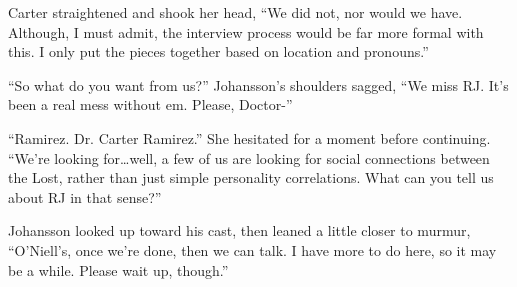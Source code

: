 Carter straightened and shook her head, ``We did not, nor would we have.  Although, I must admit, the interview process would be far more formal with this.  I only put the pieces together based on location and pronouns.''

``So what do you want from us?''  Johansson's shoulders sagged, ``We miss RJ.  It's been a real mess without em.  Please, Doctor-''

``Ramirez.  Dr. Carter Ramirez.''  She hesitated for a moment before continuing.  ``We're looking for\ldots{}well, a few of us are looking for social connections between the Lost, rather than just simple personality correlations.  What can you tell us about RJ in that sense?''

Johansson looked up toward his cast, then leaned a little closer to murmur, ``O'Niell's, once we're done, then we can talk.  I have more to do here, so it may be a while.  Please wait up, though.''
